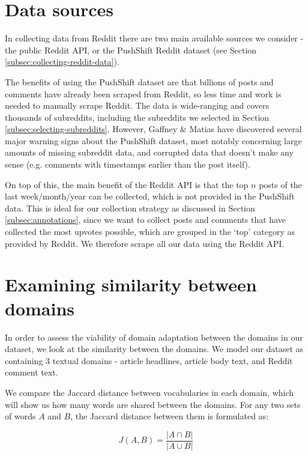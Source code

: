 \section{Data sources}

In collecting data from Reddit there are two main available sources we consider - the public Reddit API, or the PushShift Reddit dataset (see Section \ref{subsec:collecting-reddit-data}).

The benefits of using the PushShift dataset are that billions of posts and comments have already been scraped from Reddit, so less time and work is needed to manually scrape Reddit. The data is wide-ranging and covers thousands of subreddits, including the subreddits we selected in Section \ref{subsec:selecting-subreddits}. However, Gaffney \& Matias \cite{pushshift-problems} have discovered several major warning signs about the PushShift dataset, most notably concerning large amounts of missing subreddit data, and corrupted data that doesn't make any sense (e.g. comments with timestamps earlier than the post itself).

On top of this, the main benefit of the Reddit API is that the top $ n $ posts of the last week/month/year can be collected, which is not provided in the PushShift data. This is ideal for our collection strategy as discussed in Section \ref{subsec:annotations}, since we want to collect posts and comments that have collected the most upvotes possible, which are grouped in the `top' category as provided by Reddit. We therefore scrape all our data using the Reddit API.

\section{Examining similarity between domains} \label{sec:domain-similarity}

In order to assess the viability of domain adaptation between the domains in our dataset, we look at the similarity between the domains. We model our dataset as containing 3 textual domains - article headlines, article body text, and Reddit comment text.

We compare the Jaccard distance between vocabularies in each domain, which will show us how many words are shared between the domains. For any two sets of words $ A $ and $ B $, the Jaccard distance between them is formulated as:

\begin{equation}
    J(A, B) = \frac{|A \cap B|}{|A \cup B|}
\end{equation}

